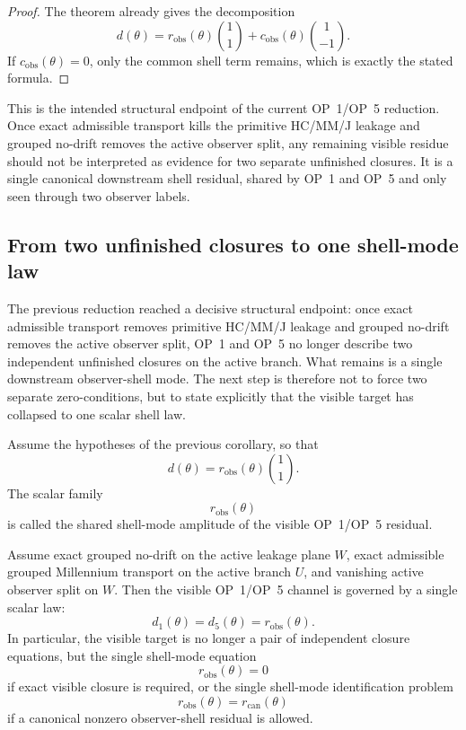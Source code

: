 \begin{proof}
The theorem already gives the decomposition
\[
  d(\theta)=r_{\mathrm{obs}}(\theta)\binom{1}{1}+c_{\mathrm{obs}}(\theta)\binom{1}{-1}.
\]
If $c_{\mathrm{obs}}(\theta)=0$, only the common shell term remains, which is exactly the stated formula.
\end{proof}

\begin{remark}
This is the intended structural endpoint of the current OP~1/OP~5 reduction. Once exact admissible transport kills the primitive HC/MM/J leakage and grouped no-drift removes the active observer split, any remaining visible residue should not be interpreted as evidence for two separate unfinished closures. It is a single canonical downstream shell residual, shared by OP~1 and OP~5 and only seen through two observer labels.
\end{remark}


\subsection*{From two unfinished closures to one shell-mode law}
The previous reduction reached a decisive structural endpoint: once exact admissible transport removes primitive HC/MM/J leakage and grouped no-drift removes the active observer split, OP~1 and OP~5 no longer describe two independent unfinished closures on the active branch. What remains is a single downstream observer-shell mode. The next step is therefore not to force two separate zero-conditions, but to state explicitly that the visible target has collapsed to one scalar shell law.

\begin{definition}
Assume the hypotheses of the previous corollary, so that
\[
  d(\theta)=r_{\mathrm{obs}}(\theta)\binom{1}{1}.
\]
The scalar family
\[
  r_{\mathrm{obs}}(\theta)
\]
is called the shared shell-mode amplitude of the visible OP~1/OP~5 residual.
\end{definition}

\begin{theorem}
Assume exact grouped no-drift on the active leakage plane $W$, exact admissible grouped Millennium transport on the active branch $U$, and vanishing active observer split on $W$. Then the visible OP~1/OP~5 channel is governed by a single scalar law:
\[
  d_1(\theta)=d_5(\theta)=r_{\mathrm{obs}}(\theta).
\]
In particular, the visible target is no longer a pair of independent closure equations, but the single shell-mode equation
\[
  r_{\mathrm{obs}}(\theta)=0
\]
if exact visible closure is required, or the single shell-mode identification problem
\[
  r_{\mathrm{obs}}(\theta)=r_{\mathrm{can}}(\theta)
\]
if a canonical nonzero observer-shell residual is allowed.
\end{theorem}


